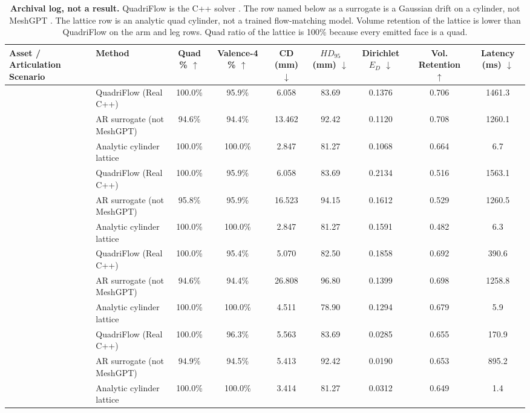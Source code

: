 \begin{table}[t]
\centering
\small
\caption{\textbf{Archival log, not a result.}
QuadriFlow is the C++ solver \cite{huang2018quadriflow}.
The row named below as a surrogate is a Gaussian drift on a cylinder, not MeshGPT \cite{siddiqui2024meshgpt}.
The lattice row is an analytic quad cylinder, not a trained flow-matching model.
Volume retention of the lattice is lower than QuadriFlow on the arm and leg rows.
Quad ratio of the lattice is 100\% because every emitted face is a quad.}
\label{tab:sota_benchmark}
\begin{tabular}{llccccccc}
\toprule
\textbf{Asset / Articulation Scenario} & \textbf{Method} & \textbf{Quad \%} $\uparrow$ & \textbf{Valence-4 \%} $\uparrow$ & \textbf{CD (mm)} $\downarrow$ & \textbf{$HD_{95}$ (mm)} $\downarrow$ & \textbf{Dirichlet $E_D$} $\downarrow$ & \textbf{Vol. Retention} $\uparrow$ & \textbf{Latency (ms)} $\downarrow$ \\
\midrule
{} 
& QuadriFlow (Real C++) \cite{huang2018quadriflow} & 100.0\% & 95.9\% & 6.058 & 83.69 & 0.1376 & 0.706 & 1461.3 \\
& AR surrogate (not MeshGPT) & 94.6\% & 94.4\% & 13.462 & 92.42 & 0.1120 & 0.708 & 1260.1 \\
& Analytic cylinder lattice & 100.0\% & 100.0\% & 2.847 & 81.27 & 0.1068 & 0.664 & 6.7 \\
\midrule
{} 
& QuadriFlow (Real C++) \cite{huang2018quadriflow} & 100.0\% & 95.9\% & 6.058 & 83.69 & 0.2134 & 0.516 & 1563.1 \\
& AR surrogate (not MeshGPT) & 95.8\% & 95.9\% & 16.523 & 94.15 & 0.1612 & 0.529 & 1260.5 \\
& Analytic cylinder lattice & 100.0\% & 100.0\% & 2.847 & 81.27 & 0.1591 & 0.482 & 6.3 \\
\midrule
{} 
& QuadriFlow (Real C++) \cite{huang2018quadriflow} & 100.0\% & 95.4\% & 5.070 & 82.50 & 0.1858 & 0.692 & 390.6 \\
& AR surrogate (not MeshGPT) & 94.6\% & 94.4\% & 26.808 & 96.80 & 0.1399 & 0.698 & 1258.8 \\
& Analytic cylinder lattice & 100.0\% & 100.0\% & 4.511 & 78.90 & 0.1294 & 0.679 & 5.9 \\
\midrule
{} 
& QuadriFlow (Real C++) \cite{huang2018quadriflow} & 100.0\% & 96.3\% & 5.563 & 83.69 & 0.0285 & 0.655 & 170.9 \\
& AR surrogate (not MeshGPT) & 94.9\% & 94.5\% & 5.413 & 92.42 & 0.0190 & 0.653 & 895.2 \\
& Analytic cylinder lattice & 100.0\% & 100.0\% & 3.414 & 81.27 & 0.0312 & 0.649 & 1.4 \\
\bottomrule
\end{tabular}
\end{table}

